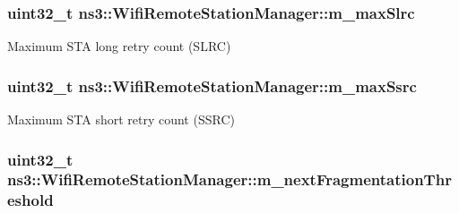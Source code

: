 \subsubsection[{\texorpdfstring{m\+\_\+max\+Slrc}{m_maxSlrc}}]{\setlength{\rightskip}{0pt plus 5cm}uint32\+\_\+t ns3\+::\+Wifi\+Remote\+Station\+Manager\+::m\+\_\+max\+Slrc\hspace{0.3cm}{\ttfamily [private]}}\hypertarget{classns3_1_1WifiRemoteStationManager_ac32ca2716dfdae73e1399ef0845c50eb}{}\label{classns3_1_1WifiRemoteStationManager_ac32ca2716dfdae73e1399ef0845c50eb}


Maximum S\+TA long retry count (S\+L\+RC) 

\subsubsection[{\texorpdfstring{m\+\_\+max\+Ssrc}{m_maxSsrc}}]{\setlength{\rightskip}{0pt plus 5cm}uint32\+\_\+t ns3\+::\+Wifi\+Remote\+Station\+Manager\+::m\+\_\+max\+Ssrc\hspace{0.3cm}{\ttfamily [private]}}\hypertarget{classns3_1_1WifiRemoteStationManager_a25cf937b8babffbe071a8d5ef5ae9f7b}{}\label{classns3_1_1WifiRemoteStationManager_a25cf937b8babffbe071a8d5ef5ae9f7b}


Maximum S\+TA short retry count (S\+S\+RC) 

\subsubsection[{\texorpdfstring{m\+\_\+next\+Fragmentation\+Threshold}{m_nextFragmentationThreshold}}]{\setlength{\rightskip}{0pt plus 5cm}uint32\+\_\+t ns3\+::\+Wifi\+Remote\+Station\+Manager\+::m\+\_\+next\+Fragmentation\+Threshold\hspace{0.3cm}{\ttfamily [private]}}\hypertarget{classns3_1_1WifiRemoteStationManager_a0721fc3daa797288f93124860fb2afd3}{}\label{classns3_1_1WifiRemoteStationManager_a0721fc3daa797288f93124860fb2afd3}


